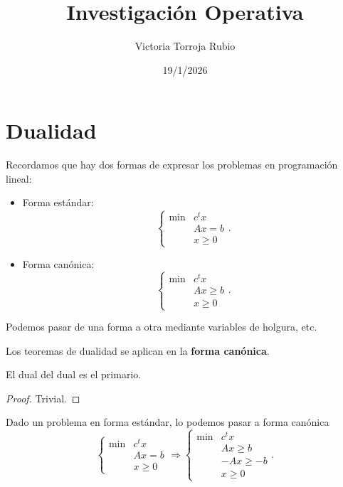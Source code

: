 \documentclass{report}
\begin{document}
\title{Investigación Operativa}
\author{Victoria Torroja Rubio}
\date{19/1/2026}

\maketitle

\tableofcontents

\pagebreak

\chapter{Dualidad}
Recordamos que hay dos formas de expresar los problemas en programación lineal:
\begin{itemize}
\item Forma estándar:
	\[
	\begin{cases}
		\min & c^{t}x \\
		     & Ax = b \\
		     & x \geq 0
	\end{cases}
	.\]
\item Forma canónica:
	\[
	\begin{cases}
		\min & c^{t}x \\
		     & Ax \geq b \\
		     & x \geq 0
	\end{cases}
	.\]
\end{itemize}
Podemos pasar de una forma a otra mediante variables de holgura, etc. 
\begin{observation}
Los teoremas de dualidad se aplican en la \textbf{forma canónica}.
\end{observation}
\begin{prop}
El dual del dual es el primario. 
\end{prop}
\begin{proof}
Trivial.
\end{proof}
Dado un problema en forma estándar, lo podemos pasar a forma canónica
\[
	\begin{cases}
		\min & c^{t}x \\
		     & Ax = b \\
		     & x \geq 0
	\end{cases} \Rightarrow
\begin{cases}
		\min & c^{t}x \\
		     & Ax \geq b \\
		     & -Ax \geq - b \\
		     & x \geq 0
	\end{cases}
	.\]
\end{document}
